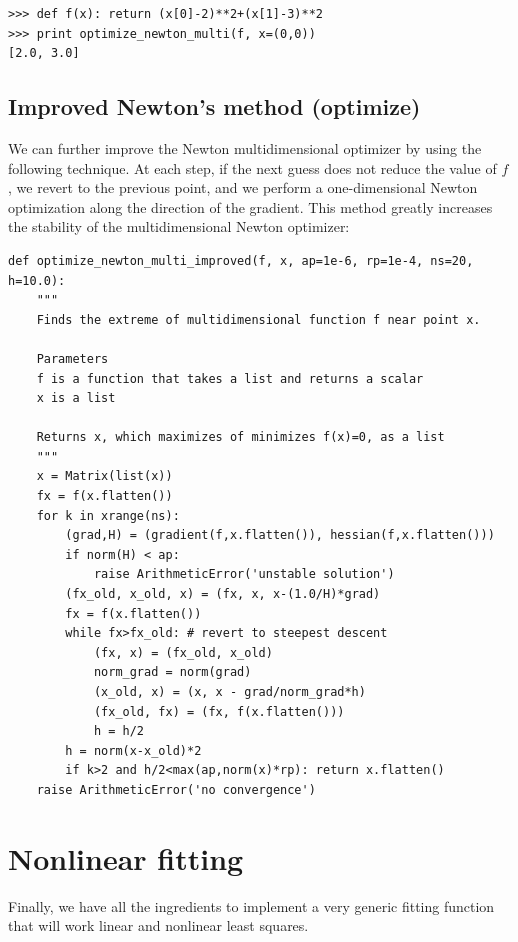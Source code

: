 \documentclass[justified,sixbynine]{tufte-book}
\def\ft{\small\tt}
\theoremstyle{plain}%
\theoremstyle{definition}
\theoremstyle{remark}
\begin{document}
\begin{fullwidth}
\begin{lstlisting}[caption={in file: {\ft nlib.py}}]
>>> def f(x): return (x[0]-2)**2+(x[1]-3)**2
>>> print optimize_newton_multi(f, x=(0,0))
[2.0, 3.0]
\end{lstlisting}

\goodbreak\subsection{Improved Newton's method (optimize)}

We can further improve the Newton multidimensional optimizer by using the following technique. At each step, if the next guess does not reduce the value of $f$, we revert to the previous point, and we perform a one-dimensional Newton optimization along the direction of the gradient. This method greatly increases the stability of the multidimensional Newton optimizer:

\begin{lstlisting}[caption={in file: {\ft nlib.py}}]
def optimize_newton_multi_improved(f, x, ap=1e-6, rp=1e-4, ns=20, h=10.0):
    """
    Finds the extreme of multidimensional function f near point x.

    Parameters
    f is a function that takes a list and returns a scalar
    x is a list

    Returns x, which maximizes of minimizes f(x)=0, as a list
    """
    x = Matrix(list(x))
    fx = f(x.flatten())
    for k in xrange(ns):
        (grad,H) = (gradient(f,x.flatten()), hessian(f,x.flatten()))
        if norm(H) < ap:
            raise ArithmeticError('unstable solution')
        (fx_old, x_old, x) = (fx, x, x-(1.0/H)*grad)
        fx = f(x.flatten())
        while fx>fx_old: # revert to steepest descent
            (fx, x) = (fx_old, x_old)
            norm_grad = norm(grad)
            (x_old, x) = (x, x - grad/norm_grad*h)
            (fx_old, fx) = (fx, f(x.flatten()))
            h = h/2
        h = norm(x-x_old)*2
        if k>2 and h/2<max(ap,norm(x)*rp): return x.flatten()
    raise ArithmeticError('no convergence')
\end{lstlisting}

\goodbreak\section{Nonlinear fitting}

Finally, we have all the ingredients to implement a very generic fitting function that will work linear and nonlinear least squares.


\end{fullwidth}
\end{document}
